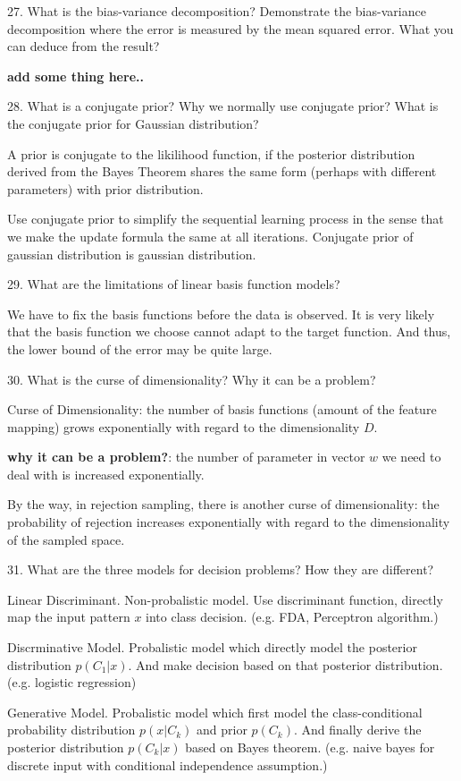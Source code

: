 \documentclass[11pt,a4paper]{article}
\newcommand{\BOLD}[1]{\textbf{#1}}
\begin{document}
27. What is the bias-variance decomposition? Demonstrate the bias-variance decomposition where the error is measured by the mean squared error. What you can deduce from the result?
    
    \BOLD{\huge add some thing here..}

28. What is a conjugate prior? Why we normally use conjugate prior? What is the conjugate prior for Gaussian distribution?

A prior is conjugate to the likilihood function, if the posterior distribution derived from the Bayes Theorem shares the same form (perhaps with different parameters) with prior distribution. 

    Use conjugate prior to simplify the sequential learning process in the sense that we make the update formula the same at all iterations. 
    Conjugate prior of gaussian distribution is gaussian distribution.

29. What are the limitations of linear basis function models? 

    We have to fix the basis functions before the data is observed. It is very likely that the basis function we choose cannot adapt to the target function. And thus, the lower bound of the error may be quite large.

30. What is the curse of dimensionality? Why it can be a problem?
    
Curse of Dimensionality: the number of basis functions (amount of the feature mapping) grows exponentially with regard to the dimensionality $D$.

\BOLD{why it can be a problem?}: the number of parameter in vector $w$ we need to deal with is increased exponentially. 

By the way, in rejection sampling, there is another curse of dimensionality: the probability of rejection increases exponentially with regard to the dimensionality of the sampled space.

31. What are the three models for decision problems? How they are different?
    
    Linear Discriminant. Non-probalistic model. Use discriminant function, directly map the input pattern $x$ into class decision. (e.g. FDA, Perceptron algorithm.)

    Discrminative Model. Probalistic model which directly model the posterior distribution $p(C_1|x)$. And make decision based on that posterior distribution. (e.g. logistic regression)

    Generative Model. Probalistic model which first model the class-conditional probability distribution $p(x|C_k)$ and prior $p(C_k)$. And finally derive the posterior distribution $p(C_k|x)$ based on Bayes theorem. (e.g. naive bayes for discrete input with conditional independence assumption.)
    
\end{document}
